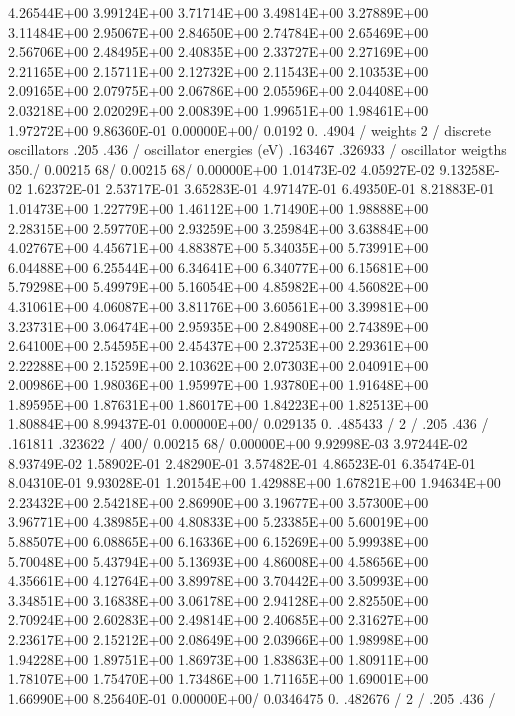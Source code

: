 \begin{ccode}
  4.26544E+00  3.99124E+00  3.71714E+00  3.49814E+00  3.27889E+00
  3.11484E+00  2.95067E+00  2.84650E+00  2.74784E+00  2.65469E+00
  2.56706E+00  2.48495E+00  2.40835E+00  2.33727E+00  2.27169E+00
  2.21165E+00  2.15711E+00  2.12732E+00  2.11543E+00  2.10353E+00
  2.09165E+00  2.07975E+00  2.06786E+00  2.05596E+00  2.04408E+00
  2.03218E+00  2.02029E+00  2.00839E+00  1.99651E+00  1.98461E+00
  1.97272E+00  9.86360E-01  0.00000E+00/
    0.0192  0.  .4904 /      weights
    2 /                      discrete oscillators
   .205  .436 /              oscillator energies (eV)
    .163467   .326933  /     oscillator weigths
 350./
 0.00215 68/
 0.00215 68/
  0.00000E+00  1.01473E-02  4.05927E-02  9.13258E-02  1.62372E-01
  2.53717E-01  3.65283E-01  4.97147E-01  6.49350E-01  8.21883E-01
  1.01473E+00  1.22779E+00  1.46112E+00  1.71490E+00  1.98888E+00
  2.28315E+00  2.59770E+00  2.93259E+00  3.25984E+00  3.63884E+00
  4.02767E+00  4.45671E+00  4.88387E+00  5.34035E+00  5.73991E+00
  6.04488E+00  6.25544E+00  6.34641E+00  6.34077E+00  6.15681E+00
  5.79298E+00  5.49979E+00  5.16054E+00  4.85982E+00  4.56082E+00
  4.31061E+00  4.06087E+00  3.81176E+00  3.60561E+00  3.39981E+00
  3.23731E+00  3.06474E+00  2.95935E+00  2.84908E+00  2.74389E+00
  2.64100E+00  2.54595E+00  2.45437E+00  2.37253E+00  2.29361E+00
  2.22288E+00  2.15259E+00  2.10362E+00  2.07303E+00  2.04091E+00
  2.00986E+00  1.98036E+00  1.95997E+00  1.93780E+00  1.91648E+00
  1.89595E+00  1.87631E+00  1.86017E+00  1.84223E+00  1.82513E+00
  1.80884E+00  8.99437E-01  0.00000E+00/
    0.029135  0.  .485433 /
    2 /
   .205  .436 /
    .161811   .323622 /
 400/
 0.00215 68/
  0.00000E+00  9.92998E-03  3.97244E-02  8.93749E-02  1.58902E-01
  2.48290E-01  3.57482E-01  4.86523E-01  6.35474E-01  8.04310E-01
  9.93028E-01  1.20154E+00  1.42988E+00  1.67821E+00  1.94634E+00
  2.23432E+00  2.54218E+00  2.86990E+00  3.19677E+00  3.57300E+00
  3.96771E+00  4.38985E+00  4.80833E+00  5.23385E+00  5.60019E+00
  5.88507E+00  6.08865E+00  6.16336E+00  6.15269E+00  5.99938E+00
  5.70048E+00  5.43794E+00  5.13693E+00  4.86008E+00  4.58656E+00
  4.35661E+00  4.12764E+00  3.89978E+00  3.70442E+00  3.50993E+00
  3.34851E+00  3.16838E+00  3.06178E+00  2.94128E+00  2.82550E+00
  2.70924E+00  2.60283E+00  2.49814E+00  2.40685E+00  2.31627E+00
  2.23617E+00  2.15212E+00  2.08649E+00  2.03966E+00  1.98998E+00
  1.94228E+00  1.89751E+00  1.86973E+00  1.83863E+00  1.80911E+00
  1.78107E+00  1.75470E+00  1.73486E+00  1.71165E+00  1.69001E+00
  1.66990E+00  8.25640E-01  0.00000E+00/
    0.0346475  0.  .482676 /
    2 /
   .205  .436  /

\end{ccode}
